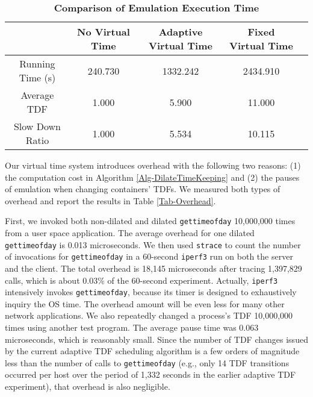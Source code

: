 \begin{table*}
\centering
\caption{\textbf{Comparison of Emulation Execution Time}}
\begin{tabular}{|c|c|c|c|c|} 
\hline
 & No Virtual Time & Adaptive Virtual Time & Fixed Virtual Time \\ 
\hline
Running Time (s)  & 240.730 & 1332.242 & 2434.910 \\ 
\hline
Average TDF & 1.000 & 5.900 & 11.000 \\ 
\hline
Slow Down Ratio & 1.000 & 5.534 & 10.115 \\
\hline
\end{tabular}
\label{Tab-CompareRunTime}
\end{table*}



Our virtual time system introduces overhead with the following two reasons: (1) the computation cost in Algorithm \ref{Alg-DilateTimeKeeping} and (2) the pauses of emulation when changing containers' TDFs. We measured both types of overhead and report the results in Table \ref{Tab-Overhead}.

First, we invoked both non-dilated and dilated \texttt{gettimeofday} 10,000,000 times from a user space application. The average overhead for one dilated \texttt{gettimeofday} is 0.013 microseconds.  We then used \texttt{strace} to count the number of invocations for \texttt{gettimeofday} in a 60-second \texttt{iperf3} run on both the server and the client. The total overhead is 18,145 microseconds after tracing 1,397,829 calls, which is about 0.03\% of the 60-second experiment. 
Actually, \texttt{iperf3} intensively invokes \texttt{gettimeofday}, because its timer is designed to exhaustively inquiry the OS time. The overhead amount will be even less for many other network applications. We also repeatedly changed a process's TDF 10,000,000 times using another test program. The average pause time was 0.063 microseconds, which is reasonably small. Since the number of TDF changes issued by the current adaptive TDF scheduling algorithm is a few orders of magnitude less than the number of calls to \texttt{gettimeofday} (e.g., only 14 TDF transitions occurred per host over the period of 1,332 seconds in the earlier adaptive TDF experiment), that overhead is also negligible.

